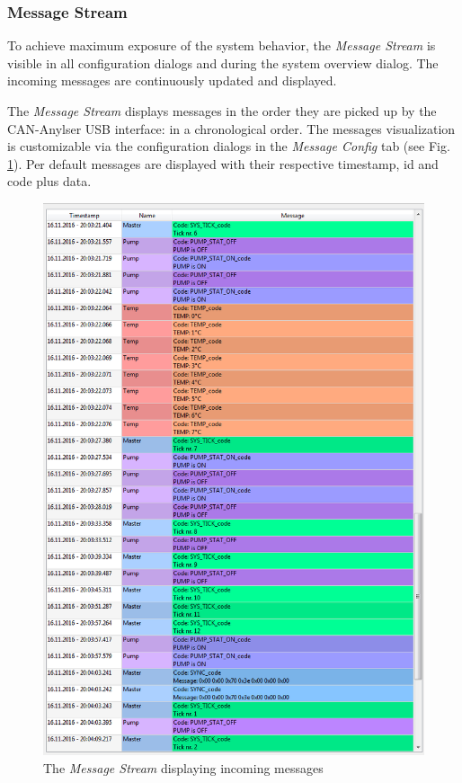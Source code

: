 \documentclass[12pt,a4paper]{scrartcl}
\begin{document}
\subsubsection{Message Stream}
\label{subsubsec:GettingStartedOverviewMsgStream}
To achieve maximum exposure of the system behavior, the \textit{Message Stream} is visible in all configuration dialogs and during the system overview dialog. The incoming messages are continuously updated and displayed. 

The \textit{Message Stream} displays messages in the order they are picked up by the CAN-Anylser USB interface: in a chronological order. The messages visualization is customizable via the configuration dialogs in the \textit{Message Config} tab (see Fig. \ref{fig:MessageStreamOvrv}). Per default messages are displayed with their respective timestamp, id and code plus data. 


\begin{figure}
	\centering
	\includegraphics[width=\linewidth,keepaspectratio]{Graphics/MessageStream}
	\caption[Message Stream]{The \textit{Message Stream} displaying incoming messages}
	\label{fig:MessageStreamOvrv}
\end{figure}
\end{document}
